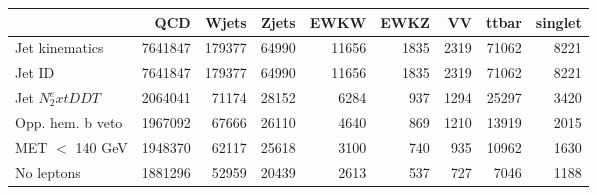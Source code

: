 \begin{tabular}{lrrrrrrrr}
\toprule
 & QCD & Wjets & Zjets & EWKW & EWKZ & VV & ttbar & singlet \\
\midrule
Jet kinematics & 7641847 & 179377 & 64990 & 11656 & 1835 & 2319 & 71062 & 8221 \\
Jet ID & 7641847 & 179377 & 64990 & 11656 & 1835 & 2319 & 71062 & 8221 \\
Jet $N_2^	ext{DDT}$ & 2064041 & 71174 & 28152 & 6284 & 937 & 1294 & 25297 & 3420 \\
Opp. hem. b veto & 1967092 & 67666 & 26110 & 4640 & 869 & 1210 & 13919 & 2015 \\
MET $<$ 140 GeV & 1948370 & 62117 & 25618 & 3100 & 740 & 935 & 10962 & 1630 \\
No leptons & 1881296 & 52959 & 20439 & 2613 & 537 & 727 & 7046 & 1188 \\
\bottomrule
\end{tabular}
